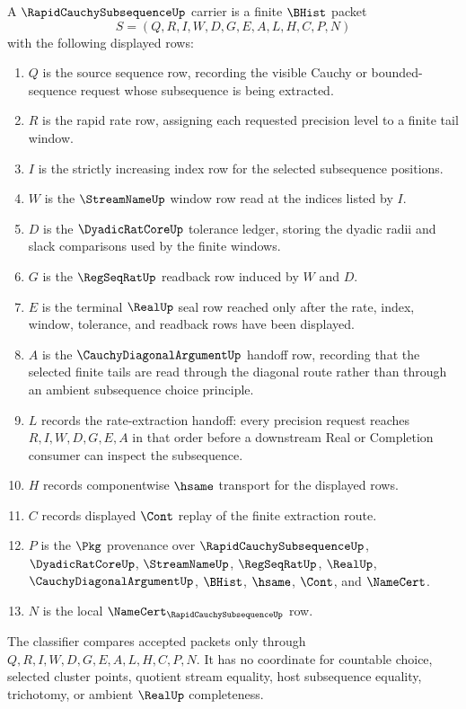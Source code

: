 \begin{definition}
\label{def:rapid-cauchy-subsequence-carrier}
A $\RapidCauchySubsequenceUp$ carrier is a finite $\BHist$ packet
$$
S=(Q,R,I,W,D,G,E,A,L,H,C,P,N)
$$
with the following displayed rows:
\begin{enumerate}
\item $Q$ is the source sequence row, recording the visible Cauchy or bounded-sequence request whose subsequence is being extracted.
\item $R$ is the rapid rate row, assigning each requested precision level to a finite tail window.
\item $I$ is the strictly increasing index row for the selected subsequence positions.
\item $W$ is the $\StreamNameUp$ window row read at the indices listed by $I$.
\item $D$ is the $\DyadicRatCoreUp$ tolerance ledger, storing the dyadic radii and slack comparisons used by the finite windows.
\item $G$ is the $\RegSeqRatUp$ readback row induced by $W$ and $D$.
\item $E$ is the terminal $\RealUp$ seal row reached only after the rate, index, window, tolerance, and readback rows have been displayed.
\item $A$ is the $\CauchyDiagonalArgumentUp$ handoff row, recording that the selected finite tails are read through the diagonal route rather than through an ambient subsequence choice principle.
\item $L$ records the rate-extraction handoff: every precision request reaches $R,I,W,D,G,E,A$ in that order before a downstream Real or Completion consumer can inspect the subsequence.
\item $H$ records componentwise $\hsame$ transport for the displayed rows.
\item $C$ records displayed $\Cont$ replay of the finite extraction route.
\item $P$ is the $\Pkg$ provenance over $\RapidCauchySubsequenceUp$, $\DyadicRatCoreUp$, $\StreamNameUp$, $\RegSeqRatUp$, $\RealUp$, $\CauchyDiagonalArgumentUp$, $\BHist$, $\hsame$, $\Cont$, and $\NameCert$.
\item $N$ is the local $\NameCert_{\RapidCauchySubsequenceUp}$ row.
\end{enumerate}
The classifier compares accepted packets only through $Q,R,I,W,D,G,E,A,L,H,C,P,N$. It has no coordinate for countable choice, selected cluster points, quotient stream equality, host subsequence equality, trichotomy, or ambient $\RealUp$ completeness.
\end{definition}

